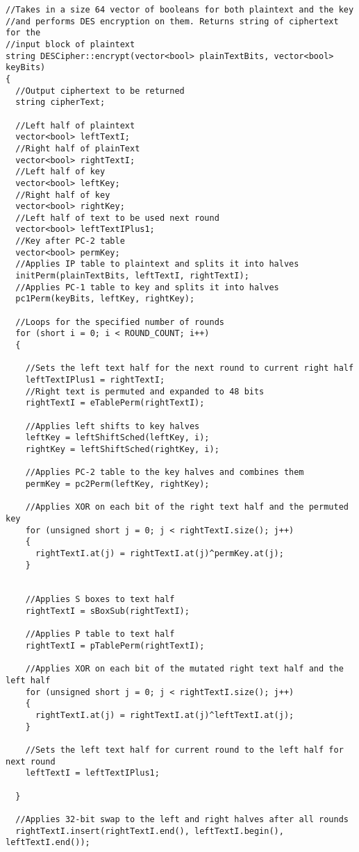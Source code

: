 \documentclass[11pt]{article}
\begin{document}
\begin{verbatim}
//Takes in a size 64 vector of booleans for both plaintext and the key
//and performs DES encryption on them. Returns string of ciphertext for the
//input block of plaintext
string DESCipher::encrypt(vector<bool> plainTextBits, vector<bool> keyBits)
{
  //Output ciphertext to be returned
  string cipherText;

  //Left half of plaintext
  vector<bool> leftTextI;
  //Right half of plainText
  vector<bool> rightTextI;
  //Left half of key
  vector<bool> leftKey;
  //Right half of key
  vector<bool> rightKey;
  //Left half of text to be used next round
  vector<bool> leftTextIPlus1;
  //Key after PC-2 table
  vector<bool> permKey;
  //Applies IP table to plaintext and splits it into halves
  initPerm(plainTextBits, leftTextI, rightTextI);
  //Applies PC-1 table to key and splits it into halves
  pc1Perm(keyBits, leftKey, rightKey);

  //Loops for the specified number of rounds
  for (short i = 0; i < ROUND_COUNT; i++)
  {

    //Sets the left text half for the next round to current right half
    leftTextIPlus1 = rightTextI;
    //Right text is permuted and expanded to 48 bits
    rightTextI = eTablePerm(rightTextI);

    //Applies left shifts to key halves
    leftKey = leftShiftSched(leftKey, i);
    rightKey = leftShiftSched(rightKey, i);

    //Applies PC-2 table to the key halves and combines them
    permKey = pc2Perm(leftKey, rightKey);

    //Applies XOR on each bit of the right text half and the permuted key
    for (unsigned short j = 0; j < rightTextI.size(); j++)
    {
      rightTextI.at(j) = rightTextI.at(j)^permKey.at(j);
    }


    //Applies S boxes to text half
    rightTextI = sBoxSub(rightTextI);

    //Applies P table to text half
    rightTextI = pTablePerm(rightTextI);

    //Applies XOR on each bit of the mutated right text half and the left half
    for (unsigned short j = 0; j < rightTextI.size(); j++)
    {
      rightTextI.at(j) = rightTextI.at(j)^leftTextI.at(j);
    }

    //Sets the left text half for current round to the left half for next round
    leftTextI = leftTextIPlus1;

  }

  //Applies 32-bit swap to the left and right halves after all rounds
  rightTextI.insert(rightTextI.end(), leftTextI.begin(), leftTextI.end());


\end{verbatim}
\end{document}
